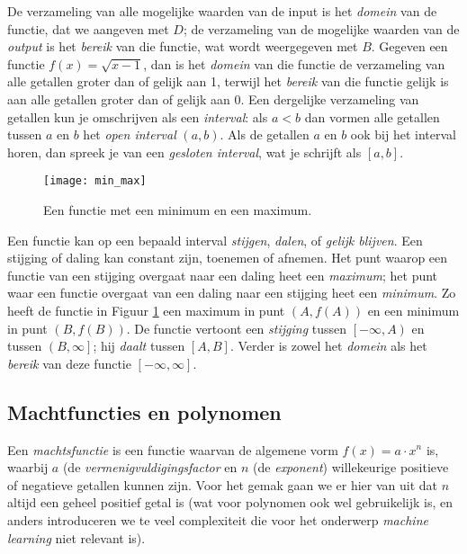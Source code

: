 De verzameling van alle mogelijke waarden van de input is het \textit{domein} van de functie, dat we aangeven met $D$; de verzameling van de mogelijke waarden van de \textit{output} is het \textit{bereik} van die functie, wat wordt weergegeven met $B$. Gegeven een functie $f(x)=\sqrt{x-1}$, dan is het \textit{domein} van die functie de verzameling van alle getallen groter dan of gelijk aan 1, terwijl het \textit{bereik} van die functie gelijk is aan alle getallen groter dan of gelijk aan 0. Een dergelijke verzameling van getallen kun je omschrijven als een \textit{interval}: als $a < b$ dan vormen alle getallen tussen $a$ en $b$ het \textit{open interval} $\left(a,b\right)$. Als de getallen $a$ en $b$ ook bij het interval horen, dan spreek je van een \textit{gesloten interval}, wat je schrijft als $\left[a,b\right]$.

\begin{figure}[h]
\centering
\texttt{[image: min\_max]}
\caption{Een functie met een minimum en een maximum.\label{img:min_max}}
\end{figure}

Een functie kan op een bepaald interval \textit{stijgen}, \textit{dalen}, of \textit{gelijk blijven}. Een stijging of daling kan constant zijn, toenemen of afnemen. Het punt waarop een functie van een stijging overgaat naar een daling heet een \textit{maximum}; het punt waar een functie overgaat van een daling naar een stijging heet een \textit{minimum}. Zo heeft de functie in Figuur \ref{img:min_max} een maximum in punt $(A, f(A))$ en een minimum in punt $(B, f(B))$. De functie vertoont een \textit{stijging} tussen $\left[-\infty, A \right)$ en tussen $\left( B, \infty \right]$; hij \textit{daalt} tussen $\left[A,B\right]$. Verder is zowel het \textit{domein} als het \textit{bereik} van deze functie $\left[-\infty, \infty\right]$.

\subsection{Machtfuncties en polynomen}

Een \textit{machtsfunctie} is een functie waarvan de algemene vorm $f(x)= a \cdot x^n$ is, waarbij $a$ (de \textit{vermenigvuldigingsfactor} en $n$ (de \textit{exponent}) willekeurige positieve of negatieve getallen kunnen zijn. Voor het gemak gaan we er hier van uit dat $n$ altijd een geheel positief getal is (wat voor polynomen ook wel gebruikelijk is, en anders introduceren we te veel complexiteit die voor het onderwerp \textit{machine learning} niet relevant is).

